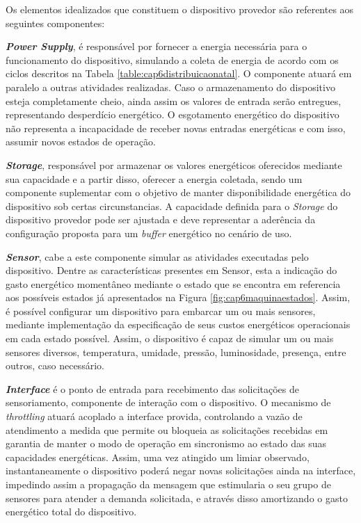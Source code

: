 Os elementos idealizados que constituem o dispositivo provedor são referentes aos seguintes componentes:

\textbf{\textit{Power Supply}}, é responsável por fornecer a energia necessária para o funcionamento do dispositivo, simulando a coleta de energia de acordo com os ciclos descritos na Tabela \ref{table:cap6distribuicaonatal}. O componente atuará em paralelo a outras atividades realizadas. Caso o armazenamento do dispositivo esteja completamente cheio, ainda assim os valores de entrada serão entregues, representando desperdício energético. O esgotamento energético do dispositivo não representa a incapacidade de receber novas entradas energéticas e com isso, assumir novos estados de operação.  

\textbf{\textit{Storage}}, responsável por armazenar os valores energéticos oferecidos mediante sua capacidade e a partir disso, oferecer a energia coletada, sendo um componente suplementar com o objetivo de manter disponibilidade energética do dispositivo sob certas circunstancias. A capacidade definida para o \textit{Storage} do dispositivo provedor pode ser ajustada e deve representar a aderência da configuração proposta para um \textit{buffer} energético no cenário de uso.  

\textbf{\textit{Sensor}}, cabe a este componente simular as atividades executadas pelo dispositivo. Dentre as características presentes em Sensor, esta a indicação do gasto energético momentâneo mediante o estado que se encontra em referencia aos possíveis estados já apresentados na Figura \ref{fig:cap6maquinaestados}. Assim, é possível configurar um dispositivo para embarcar um ou mais sensores, mediante implementação da especificação de seus custos energéticos operacionais em cada estado possível. Assim, o dispositivo é capaz de simular um ou mais sensores diversos, temperatura, umidade, pressão, luminosidade, presença, entre outros, caso necessário.

\textbf{\textit{Interface}} é o ponto de entrada para recebimento das solicitações de sensoriamento, componente de interação com o dispositivo. O mecanismo de \textit{throttling} atuará acoplado a interface provida, controlando a vazão de atendimento a medida que permite ou bloqueia as solicitações recebidas em garantia de manter o modo de operação em sincronismo ao estado das suas capacidades energéticas. Assim, uma vez atingido um limiar observado, instantaneamente o dispositivo poderá negar novas solicitações ainda na interface, impedindo assim a propagação da mensagem que estimularia o seu grupo de sensores para atender a demanda solicitada, e através disso amortizando o gasto energético total do dispositivo.




